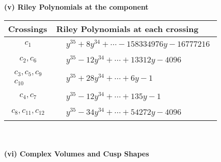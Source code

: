 \documentclass[1p]{elsarticle_modified}
\theoremstyle{definition}
\begin{document}
\newpage\renewcommand{\arraystretch}{1}
\flushleft \textbf{(v) Riley Polynomials at the component}\newline \\
\begin{tabular}{m{50pt}|m{274pt}}
Crossings & \hspace{64pt}Riley Polynomials at each crossing \\
\hline $$\begin{aligned}c_{1}\end{aligned}$$&$\begin{aligned}
&y^{35}+8 y^{34}+\cdots-158334976 y-16777216
\end{aligned}$\\
\hline $$\begin{aligned}c_{2},c_{6}\end{aligned}$$&$\begin{aligned}
&y^{35}-12 y^{34}+\cdots+13312 y-4096
\end{aligned}$\\
\hline $$\begin{aligned}c_{3},c_{5},c_{9}\\c_{10}\end{aligned}$$&$\begin{aligned}
&y^{35}+28 y^{34}+\cdots+6 y-1
\end{aligned}$\\
\hline $$\begin{aligned}c_{4},c_{7}\end{aligned}$$&$\begin{aligned}
&y^{35}-12 y^{34}+\cdots+135 y-1
\end{aligned}$\\
\hline $$\begin{aligned}c_{8},c_{11},c_{12}\end{aligned}$$&$\begin{aligned}
&y^{35}-34 y^{34}+\cdots+54272 y-4096
\end{aligned}$\\
\hline
\end{tabular}\\~\\
\newpage\flushleft \textbf{(vi) Complex Volumes and Cusp Shapes}
\end{document}
